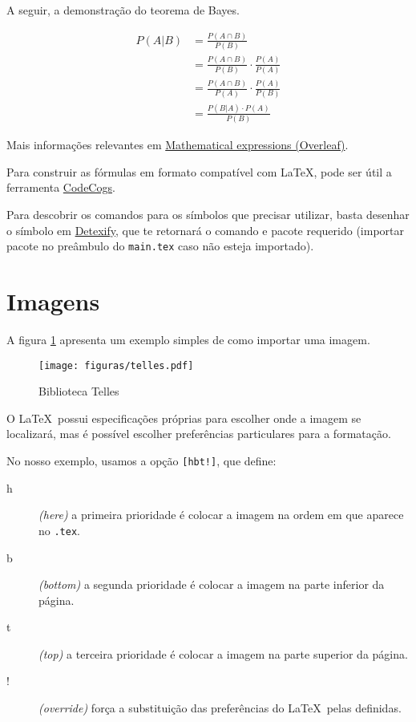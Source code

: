 A seguir, a demonstração do teorema de Bayes.

\begin{align*}
    P(A|B) &= \frac{P(A \cap B)}{P(B)}\\
    &= \frac{P(A \cap B)}{P(B)} \cdot \frac{P(A)}{P(A)}\\
    &= \frac{P(A \cap B)}{P(A)} \cdot \frac{P(A)}{P(B)}\\
    &= \frac{P(B|A) \cdot P(A)}{P(B)}\label{eqn:bayes}
\end{align*}

Mais informações relevantes em \href{https://www.overleaf.com/learn/latex/Mathematical_expressions}{Mathematical expressions (Overleaf)}.

Para construir as fórmulas em formato compatível com \LaTeX, pode ser útil a ferramenta \href{https://editor.codecogs.com/}{CodeCogs}.

Para descobrir os comandos para os símbolos que precisar utilizar, basta desenhar o símbolo em \href{https://detexify.kirelabs.org/classify.html}{Detexify}, que te retornará o comando e pacote requerido (importar pacote no preâmbulo do \texttt{main.tex} caso não esteja importado).

\section{Imagens}
A figura \ref{fig:telles} apresenta um exemplo simples de como importar uma imagem.

\begin{figure}[hbt!]
    \centering
    \texttt{[image: figuras/telles.pdf]}
    \caption{Biblioteca Telles}
    \label{fig:telles}
\end{figure}

O \LaTeX\ possui especificações próprias para escolher onde a imagem se localizará, mas é possível escolher preferências particulares para a formatação.

No nosso exemplo, usamos a opção \texttt{[hbt!]}, que define:

\begin{description}
    \item[h] \textit{(here)} a primeira prioridade é colocar a imagem na ordem em que aparece no \texttt{.tex}.
    \item[b] \textit{(bottom)} a segunda prioridade é colocar a imagem na parte inferior da página.
    \item[t] \textit{(top)} a terceira prioridade é colocar a imagem na parte superior da página.
    \item[!] \textit{(override)} força a substituição das preferências do \LaTeX\ pelas definidas.
\end{description}

